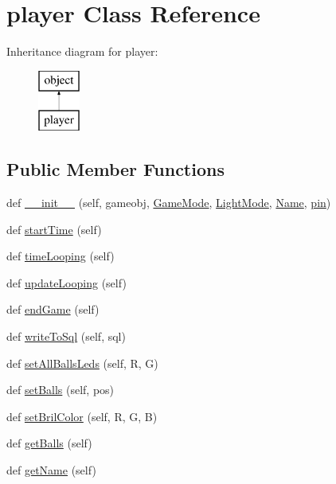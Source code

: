 \hypertarget{classgame_1_1_player_1_1player}{}\section{player Class Reference}
\label{classgame_1_1_player_1_1player}
Inheritance diagram for player\+:\begin{figure}[H]
\begin{center}
\leavevmode
\includegraphics[height=2.000000cm]{classgame_1_1_player_1_1player}
\end{center}
\end{figure}
\subsection*{Public Member Functions}
\begin{DoxyCompactItemize}
\item 
def \hyperlink{classgame_1_1_player_1_1player_a027a09f90ea572dba24b1b7840c0ddf2}{\+\_\+\+\_\+init\+\_\+\+\_\+} (self, gameobj, \hyperlink{classgame_1_1_player_1_1player_aaf5ef5a17b53e9997c837b07015589de}{Game\+Mode}, \hyperlink{classgame_1_1_player_1_1player_adbeef4da431e7d5e416c32ee188659f7}{Light\+Mode}, \hyperlink{classgame_1_1_player_1_1player_aa5998168cabfb2b2e41151349077812c}{Name}, \hyperlink{classgame_1_1_player_1_1player_aed45ca508d997dd992682abff8790bde}{pin})
\item 
def \hyperlink{classgame_1_1_player_1_1player_a1025dee804906a22181c3ea3a6f4fadc}{start\+Time} (self)
\item 
def \hyperlink{classgame_1_1_player_1_1player_a28e064aedf0753d6d5c30e46c4f791b5}{time\+Looping} (self)
\item 
def \hyperlink{classgame_1_1_player_1_1player_ac0084ae4f98be3d62cf166d2161f3234}{update\+Looping} (self)
\item 
def \hyperlink{classgame_1_1_player_1_1player_abb1fe44b5f3819007f0e499019e915e3}{end\+Game} (self)
\item 
def \hyperlink{classgame_1_1_player_1_1player_a2aae31c5ae0c817b975b2dc4ae470e98}{write\+To\+Sql} (self, sql)
\item 
def \hyperlink{classgame_1_1_player_1_1player_acd6fe061d9978ebb27c7fd1be56f2052}{set\+All\+Balls\+Leds} (self, R, G)
\item 
def \hyperlink{classgame_1_1_player_1_1player_a90c95f354f2194c788f6895a7feae1ad}{set\+Balls} (self, pos)
\item 
def \hyperlink{classgame_1_1_player_1_1player_a4fea2d8b13f9b59b91d3d14d5c28efc0}{set\+Bril\+Color} (self, R, G, B)
\item 
def \hyperlink{classgame_1_1_player_1_1player_a9747e45f935d296c2c0b508127fd7c4a}{get\+Balls} (self)
\item 
def \hyperlink{classgame_1_1_player_1_1player_a91720e5fd3a7e677f314a4b26451b864}{get\+Name} (self)
\end{DoxyCompactItemize}
